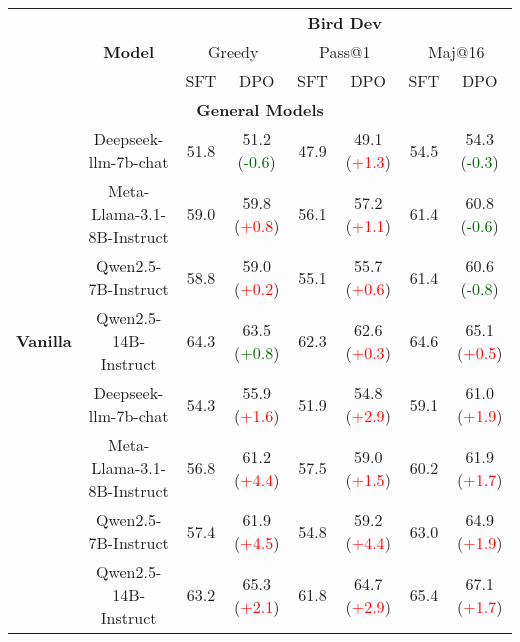 \iffalse
\begin{table*}[t!]
    \centering
    \begin{tabular}{c | c | c c | c c | c c}
        \toprule
         & \multirow{3}{*}{\textbf{Model}} & \multicolumn{6}{c}{\textbf{Bird Dev}} \\ \cline{3-8}
         & & \multicolumn{2}{c}{Greedy} & \multicolumn{2}{c}{Pass@1} & \multicolumn{2}{c}{Maj@16} \\ \cline{3-8}
         & & SFT & DPO & SFT & DPO & SFT & DPO \\ \midrule
        \multicolumn{8}{c}{\textbf{General Models}} \\ \midrule
        
        & Deepseek-llm-7b-chat & 51.8 & 51.2 (\textcolor{darkgreen}{-0.6})& 47.9  & 49.1 (\textcolor{red}{+1.3})& 54.5 & 54.3 (\textcolor{darkgreen}{-0.3}) \\ 
        & Meta-Llama-3.1-8B-Instruct & 59.0 & 59.8 (\textcolor{red}{+0.8}) & 56.1  & 57.2 (\textcolor{red}{+1.1}) & 61.4 & 60.8 (\textcolor{darkgreen}{-0.6}) \\ 
        & Qwen2.5-7B-Instruct & 58.8 & 59.0 (\textcolor{red}{+0.2}) & 55.1  & 55.7 (\textcolor{red}{+0.6}) & 61.4 & 60.6 (\textcolor{darkgreen}{-0.8}) \\ 
        \multirow{-4}{*}{\textbf{Vanilla}} & Qwen2.5-14B-Instruct & 64.3 & 63.5 (\textcolor{darkgreen}{+0.8}) & 62.3  & 62.6 (\textcolor{red}{+0.3}) &  64.6 & 65.1 (\textcolor{red}{+0.5}) \\
        
        \rowcolor{cyan!20}
        & Deepseek-llm-7b-chat & 54.3 & 55.9 (\textcolor{red}{+1.6})& 51.9  & 54.8 (\textcolor{red}{+2.9})& 59.1 & 61.0 (\textcolor{red}{+1.9}) \\ 
        \rowcolor{cyan!20}
        & Meta-Llama-3.1-8B-Instruct & 56.8 & 61.2 (\textcolor{red}{+4.4}) & 57.5  & 59.0 (\textcolor{red}{+1.5}) & 60.2 & 61.9 (\textcolor{red}{+1.7}) \\ 
        \rowcolor{cyan!20}
        & Qwen2.5-7B-Instruct & 57.4 & 61.9 (\textcolor{red}{+4.5}) & 54.8  & 59.2 (\textcolor{red}{+4.4}) & 63.0 & 64.9 (\textcolor{red}{+1.9}) \\ 
        \rowcolor{cyan!20}
        \multirow{-4}{*}{\textbf{CoT}} & Qwen2.5-14B-Instruct & 63.2 & 65.3 (\textcolor{red}{+2.1}) & 61.8  & 64.7 (\textcolor{red}{+2.9}) &  65.4 & 67.1 (\textcolor{red}{+1.7}) \\
        

\end{tabular}
\end{table*}
